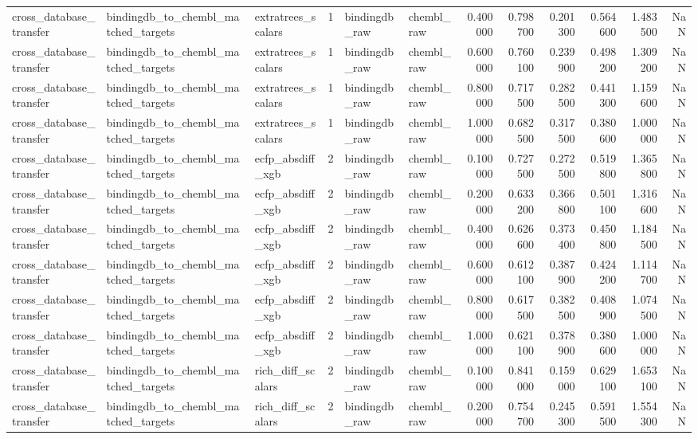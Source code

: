 \begin{longtable}{lllrllrrrrrr}
cross\_database\_transfer & bindingdb\_to\_chembl\_matched\_targets & extratrees\_scalars & 1 & bindingdb\_raw & chembl\_raw & 0.400000 & 0.798700 & 0.201300 & 0.564600 & 1.483500 & NaN \\
cross\_database\_transfer & bindingdb\_to\_chembl\_matched\_targets & extratrees\_scalars & 1 & bindingdb\_raw & chembl\_raw & 0.600000 & 0.760100 & 0.239900 & 0.498200 & 1.309200 & NaN \\
cross\_database\_transfer & bindingdb\_to\_chembl\_matched\_targets & extratrees\_scalars & 1 & bindingdb\_raw & chembl\_raw & 0.800000 & 0.717500 & 0.282500 & 0.441300 & 1.159600 & NaN \\
cross\_database\_transfer & bindingdb\_to\_chembl\_matched\_targets & extratrees\_scalars & 1 & bindingdb\_raw & chembl\_raw & 1.000000 & 0.682500 & 0.317500 & 0.380600 & 1.000000 & NaN \\
cross\_database\_transfer & bindingdb\_to\_chembl\_matched\_targets & ecfp\_absdiff\_xgb & 2 & bindingdb\_raw & chembl\_raw & 0.100000 & 0.727500 & 0.272500 & 0.519800 & 1.365800 & NaN \\
cross\_database\_transfer & bindingdb\_to\_chembl\_matched\_targets & ecfp\_absdiff\_xgb & 2 & bindingdb\_raw & chembl\_raw & 0.200000 & 0.633200 & 0.366800 & 0.501100 & 1.316600 & NaN \\
cross\_database\_transfer & bindingdb\_to\_chembl\_matched\_targets & ecfp\_absdiff\_xgb & 2 & bindingdb\_raw & chembl\_raw & 0.400000 & 0.626600 & 0.373400 & 0.450800 & 1.184500 & NaN \\
cross\_database\_transfer & bindingdb\_to\_chembl\_matched\_targets & ecfp\_absdiff\_xgb & 2 & bindingdb\_raw & chembl\_raw & 0.600000 & 0.612100 & 0.387900 & 0.424200 & 1.114700 & NaN \\
cross\_database\_transfer & bindingdb\_to\_chembl\_matched\_targets & ecfp\_absdiff\_xgb & 2 & bindingdb\_raw & chembl\_raw & 0.800000 & 0.617500 & 0.382500 & 0.408900 & 1.074500 & NaN \\
cross\_database\_transfer & bindingdb\_to\_chembl\_matched\_targets & ecfp\_absdiff\_xgb & 2 & bindingdb\_raw & chembl\_raw & 1.000000 & 0.621100 & 0.378900 & 0.380600 & 1.000000 & NaN \\
cross\_database\_transfer & bindingdb\_to\_chembl\_matched\_targets & rich\_diff\_scalars & 2 & bindingdb\_raw & chembl\_raw & 0.100000 & 0.841000 & 0.159000 & 0.629100 & 1.653100 & NaN \\
cross\_database\_transfer & bindingdb\_to\_chembl\_matched\_targets & rich\_diff\_scalars & 2 & bindingdb\_raw & chembl\_raw & 0.200000 & 0.754700 & 0.245300 & 0.591500 & 1.554300 & NaN \\

\end{longtable}
